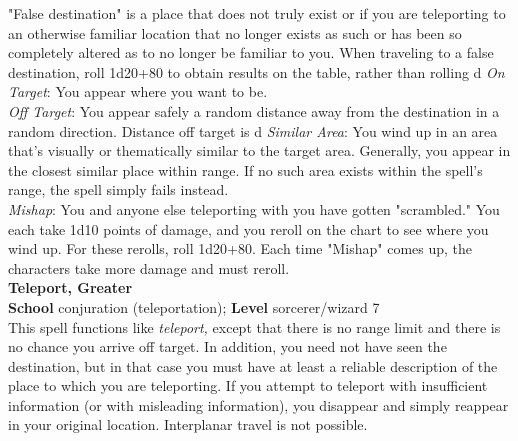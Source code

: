 "False destination" is a place that does not truly exist or if you are teleporting to an otherwise familiar location that no longer exists as such or has been so completely altered as to no longer be familiar to you. When traveling to a false destination, roll 1d20+80 to obtain results on the table, rather than rolling d%
\textit{On Target}: You appear where you want to be.\\
\textit{Off Target}: You appear safely a random distance away from the destination in a random direction. Distance off target is d%
\textit{Similar Area}: You wind up in an area that's visually or thematically similar to the target area. Generally, you appear in the closest similar place within range. If no such area exists within the spell's range, the spell simply fails instead.\\
\textit{Mishap}: You and anyone else teleporting with you have gotten "scrambled." You each take 1d10 points of damage, and you reroll on the chart to see where you wind up. For these rerolls, roll 1d20+80. Each time "Mishap" comes up, the characters take more damage and must reroll.\\
\textbf{Teleport, Greater}\\
\textbf{School} conjuration (teleportation); \textbf{Level} sorcerer/wizard 7\\
This spell functions like \textit{teleport, }except that there is no range limit and there is no chance you arrive off target. In addition, you need not have seen the destination, but in that case you must have at least a reliable description of the place to which you are teleporting. If you attempt to teleport with insufficient information (or with misleading information), you disappear and simply reappear in your original location. Interplanar travel is not possible.\\
